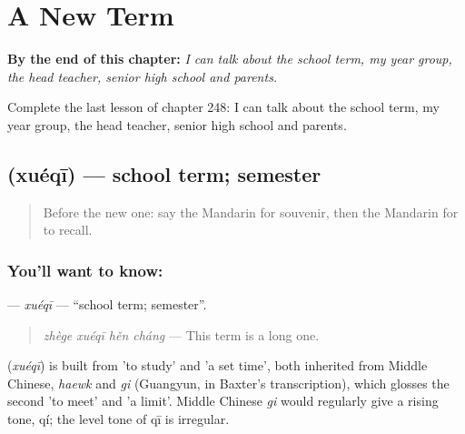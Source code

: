 
\chapter{A New Term}
\label{ch:zh-a-new-term}

\begin{chapteropening}
\textbf{By the end of this chapter:} \emph{I can talk about the school term, my year group, the head teacher, senior high school and parents.}

Complete the last lesson of chapter 248: I can talk about the school term, my year group, the head teacher, senior high school and parents.
\end{chapteropening}

\section[\texorpdfstring{\zh{学期} (xuéqī)}{学期 (xuéqī)}]{ (xuéqī) — school term; semester}

\label{lesson:ZH-C248-xueqi}



\begin{quote}
Before the new one: say the Mandarin for souvenir, then the Mandarin for to recall.
\end{quote}

\subsection*{You'll want to know: }
\textbf{} — \emph{xuéqī} — \textquotedblleft{}school term; semester\textquotedblright{}.

\begin{quote}
\textbf{} \emph{zhège xuéqī hěn cháng} — This term is a long one.
\end{quote}

\begin{cousinweb}
\textbf{} (\emph{xuéqī}) is built from  'to study' and  'a set time', both inherited from Middle Chinese, \emph{haewk} and \emph{gi} (Guangyun, in Baxter's transcription), which glosses the second 'to meet' and 'a limit'. Middle Chinese \emph{gi} would regularly give a rising tone, qí; the level tone of qī is irregular.
\end{cousinweb}


